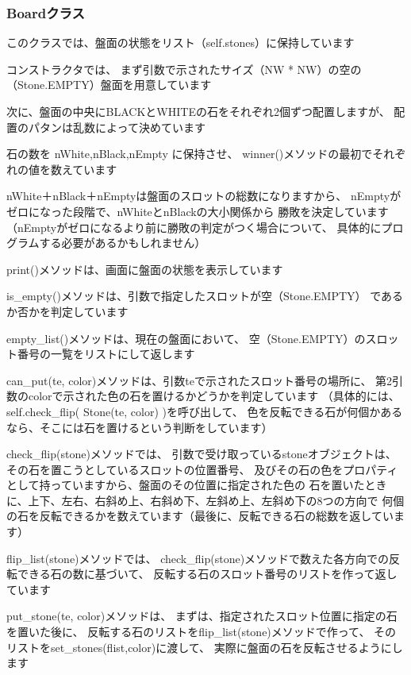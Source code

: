 \documentclass[uplatex,a4paper,11pt,oneside,openany]{jsbook}
\begin{document}
\subsubsection{Boardクラス}

このクラスでは、盤面の状態をリスト（self.stones）に保持しています

コンストラクタでは、
まず引数で示されたサイズ（NW * NW）の空の（Stone.EMPTY）盤面を用意しています

次に、盤面の中央にBLACKとWHITEの石をそれぞれ2個ずつ配置しますが、
配置のパタンは乱数によって決めています

石の数を nWhite,nBlack,nEmpty に保持させ、
winner()メソッドの最初でそれぞれの値を数えています

nWhite＋nBlack＋nEmptyは盤面のスロットの総数になりますから、
nEmptyがゼロになった段階で、nWhiteとnBlackの大小関係から
勝敗を決定しています
（nEmptyがゼロになるより前に勝敗の判定がつく場合について、
具体的にプログラムする必要があるかもしれません）

print()メソッドは、画面に盤面の状態を表示しています

is\_empty()メソッドは、引数で指定したスロットが空（Stone.EMPTY）
であるか否かを判定しています

empty\_list()メソッドは、現在の盤面において、
空（Stone.EMPTY）のスロット番号の一覧をリストにして返します

can\_put(te, color)メソッドは、引数teで示されたスロット番号の場所に、
第2引数のcolorで示された色の石を置けるかどうかを判定しています
（具体的には、self.check\_flip( Stone(te, color) )を呼び出して、
色を反転できる石が何個かあるなら、そこには石を置けるという判断をしています）

check\_flip(stone)メソッドでは、
引数で受け取っているstoneオブジェクトは、その石を置こうとしているスロットの位置番号、
及びその石の色をプロパティとして持っていますから、盤面のその位置に指定された色の
石を置いたときに、上下、左右、右斜め上、右斜め下、左斜め上、左斜め下の8つの方向で
何個の石を反転できるかを数えています（最後に、反転できる石の総数を返しています）

flip\_list(stone)メソッドでは、
check\_flip(stone)メソッドで数えた各方向での反転できる石の数に基づいて、
反転する石のスロット番号のリストを作って返しています

put\_stone(te, color)メソッドは、
まずは、指定されたスロット位置に指定の石を置いた後に、
反転する石のリストをflip\_list(stone)メソッドで作って、
そのリストをset\_stones(flist,color)に渡して、
実際に盤面の石を反転させるようにします
\end{document}
